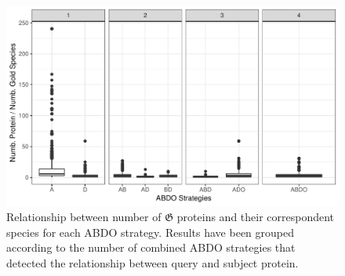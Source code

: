 \documentclass[11pt]{article}
\begin{document}
\begin{figure}[ht!]
	\centering
	\includegraphics[scale=0.7]{figures/relationGoldenABDO}
	\caption{Relationship between number of $\boldsymbol{\mathfrak{G}}$ proteins and
	their correspondent species for each ABDO strategy. Results have been grouped
	according to the number of combined ABDO strategies that detected the relationship
	between query and subject protein.}\label{fig:relation}
\end{figure}
\end{document}
